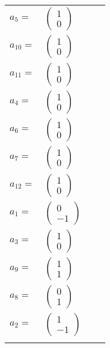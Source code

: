 \documentclass[1p]{elsarticle_modified}
\theoremstyle{definition}
\begin{document}
\begin{tabular}{m{7pt} m{180pt} m{7pt} m{180pt} }
\flushright $a_{5}=$&$\begin{pmatrix}1\\0\end{pmatrix}$ \\
\flushright $a_{10}=$&$\begin{pmatrix}1\\0\end{pmatrix}$ \\
\flushright $a_{11}=$&$\begin{pmatrix}1\\0\end{pmatrix}$ \\
\flushright $a_{4}=$&$\begin{pmatrix}1\\0\end{pmatrix}$ \\
\flushright $a_{6}=$&$\begin{pmatrix}1\\0\end{pmatrix}$ \\
\flushright $a_{7}=$&$\begin{pmatrix}1\\0\end{pmatrix}$ \\
\flushright $a_{12}=$&$\begin{pmatrix}1\\0\end{pmatrix}$ \\
\flushright $a_{1}=$&$\begin{pmatrix}0\\-1\end{pmatrix}$ \\
\flushright $a_{3}=$&$\begin{pmatrix}1\\0\end{pmatrix}$ \\
\flushright $a_{9}=$&$\begin{pmatrix}1\\1\end{pmatrix}$ \\
\flushright $a_{8}=$&$\begin{pmatrix}0\\1\end{pmatrix}$ \\
\flushright $a_{2}=$&$\begin{pmatrix}1\\-1\end{pmatrix}$\\&\end{tabular}
\end{document}

